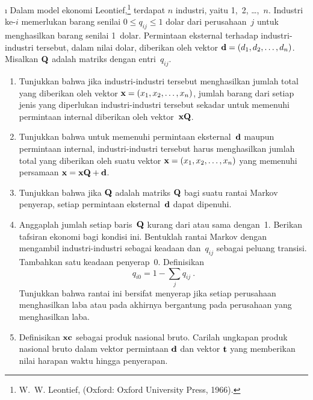 \begin{LJSItem}
\i\label{exer 11.2.21} Dalam model ekonomi Leontief,\footnote{W.~W. Leontief, 
 (Oxford: Oxford University Press, 1966).} terdapat
$n$ industri, yaitu 1,~2, \ldots,~$n$. Industri ke-$i$ memerlukan barang senilai
$0 \leq q_{ij} \leq 1$ dolar dari perusahaan~$j$ untuk menghasilkan barang
senilai 1~dolar. Permintaan eksternal terhadap industri-industri tersebut,
dalam nilai dolar, diberikan oleh vektor ${\mbox{\bf d}\/} = (d_1,d_2,\ldots,d_n)$.
Misalkan ${\mbox{\bf Q}\/}$ adalah matriks dengan entri~$q_{ij}$.
\begin{enumerate}

\item Tunjukkan bahwa jika industri-industri tersebut menghasilkan jumlah total
yang diberikan oleh vektor ${\mbox{\bf x}\/} = (x_1,x_2,\ldots,x_n)$, jumlah barang dari
setiap jenis yang diperlukan industri-industri tersebut sekadar untuk memenuhi
permintaan internal diberikan oleh vektor~${\mbox{\bf x}\/} {\mbox{\bf Q}\/}$.

\item Tunjukkan bahwa untuk memenuhi permintaan eksternal~${\mbox{\bf d}\/}$ maupun
permintaan internal, industri-industri tersebut harus menghasilkan jumlah total
yang diberikan oleh suatu vektor ${\mbox{\bf x}\/} = (x_1,x_2,\ldots,x_n)$ yang memenuhi
persamaan ${\mbox{\bf x}\/} = {\mbox{\bf x}\/} {\mbox{\bf Q}\/} + {\mbox{\bf d}\/}$.

\item Tunjukkan bahwa jika ${\mbox{\bf Q}\/}$ adalah matriks ${\mbox{\bf Q}\/}$ bagi suatu rantai
Markov penyerap, setiap permintaan eksternal~${\mbox{\bf d}\/}$ dapat dipenuhi.

\item Anggaplah jumlah setiap baris~${\mbox{\bf Q}\/}$ kurang dari atau sama dengan~1.
Berikan tafsiran ekonomi bagi kondisi ini. Bentuklah rantai Markov dengan
mengambil industri-industri sebagai keadaan dan~$q_{ij}$ sebagai peluang
transisi. Tambahkan satu keadaan penyerap~0. Definisikan
$$
q_{i0} = 1 - \sum_j q_{ij}\ .
$$
Tunjukkan bahwa rantai ini bersifat menyerap jika setiap perusahaan menghasilkan
laba atau pada akhirnya bergantung pada perusahaan yang menghasilkan laba.

\item Definisikan ${\mbox{\bf x}\/} {\mbox{\bf c}\/}$ sebagai produk nasional bruto. Carilah
ungkapan produk nasional bruto dalam vektor permintaan ${\mbox{\bf d}\/}$ dan vektor
${\mbox{\bf t}\/}$ yang memberikan nilai harapan waktu hingga penyerapan.
\end{enumerate}


\end{LJSItem}
